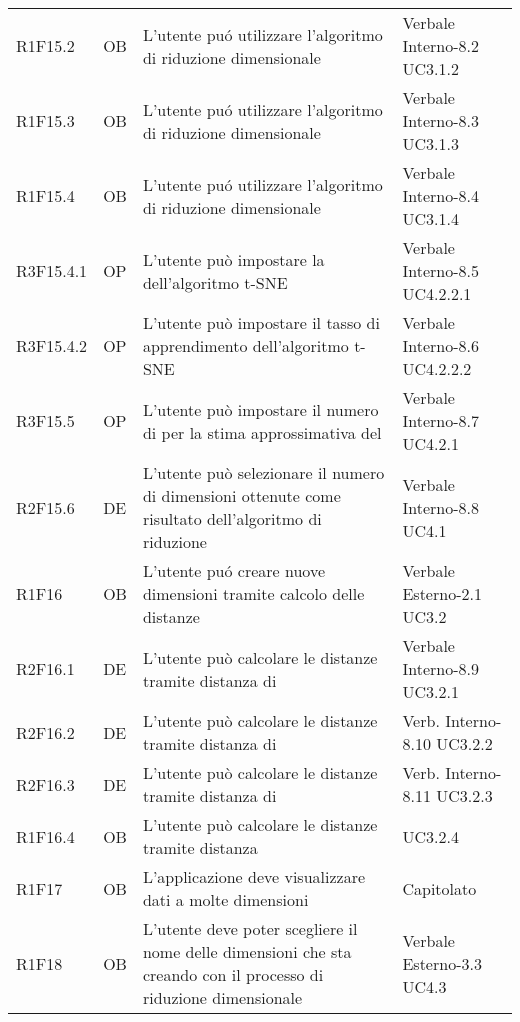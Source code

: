 {\begin{longtable}{C{2cm} | C{1.5cm} | C{9cm} | C{3.3cm}}
R1F15.2 & OB & L'utente puó utilizzare l'algoritmo di riduzione dimensionale  & Verbale Interno-8.2 \newline UC3.1.2\\
R1F15.3 & OB & L'utente puó utilizzare l'algoritmo di riduzione dimensionale  & Verbale Interno-8.3 \newline UC3.1.3\\
R1F15.4 & OB & L'utente puó utilizzare l'algoritmo di riduzione dimensionale  & Verbale Interno-8.4 \newline UC3.1.4\\
R3F15.4.1 & OP & L'utente può impostare la  dell'algoritmo t-SNE & Verbale Interno-8.5 \newline UC4.2.2.1\\
R3F15.4.2 & OP & L'utente può impostare il tasso di apprendimento dell'algoritmo t-SNE & Verbale Interno-8.6 \newline UC4.2.2.2\\
R3F15.5 & OP & L'utente può impostare il numero di  per la stima approssimativa del  & Verbale Interno-8.7 \newline UC4.2.1\\
R2F15.6 & DE & L'utente può selezionare il numero di dimensioni ottenute come risultato dell'algoritmo di riduzione & Verbale Interno-8.8 \newline UC4.1\\
R1F16 & OB & L'utente puó creare nuove dimensioni tramite calcolo delle distanze & Verbale Esterno-2.1 \newline UC3.2\\ 
R2F16.1 & DE & L'utente può calcolare le distanze tramite distanza di  &  Verbale Interno-8.9 \newline UC3.2.1\\
R2F16.2 & DE & L'utente può calcolare le distanze tramite distanza di  & Verb. Interno-8.10 \newline UC3.2.2 \\
R2F16.3 & DE & L'utente può calcolare le distanze tramite distanza di  &  Verb. Interno-8.11 \newline UC3.2.3\\
R1F16.4 & OB & L'utente può calcolare le distanze tramite distanza  &  UC3.2.4\\
R1F17 & OB & L'applicazione deve visualizzare dati a molte dimensioni & Capitolato\\
R1F18 & OB & L'utente deve poter scegliere il nome delle dimensioni che sta creando con il processo di riduzione dimensionale & Verbale Esterno-3.3 \newline UC4.3\\


\end{longtable}
}







